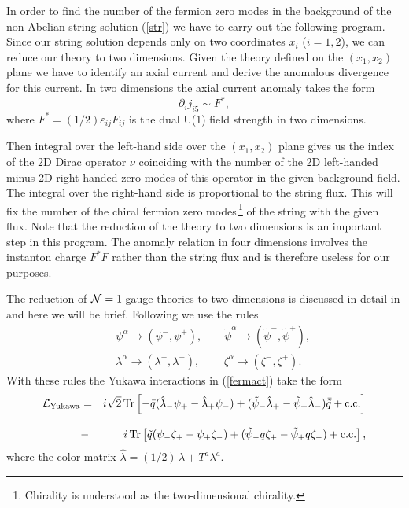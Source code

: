 \documentclass[epsfig,12pt]{article}
\def\beqn{\begin{eqnarray}}
\def\eeqn{\end{eqnarray}}
\def\beq{\begin{equation}}
\def\eeq{\end{equation}}
\newcommand{\none}{${\cal N}=1\;$}
\newcommand{\pt}{\partial}
\begin{document}
\mbox{}
\vspace{0.1mm}
\mbox{}

\noindent
In order to find the number of the fermion zero modes in the background
of the non-Abelian string solution (\ref{str}) we have to carry out the following
program. Since our string solution depends only on two  coordinates 
$x_i$ ($i=1,2$), we can reduce our theory to two dimensions. Given the theory
defined on the $(x_1,x_2)$ plane we have to identify an axial current and derive
the anomalous divergence for this current. In two dimensions the axial current anomaly takes the form
\beq
\pt_ij_{i5}\sim F^{*},
\label{appranom}
\eeq
where $F^{*}=(1/2)\varepsilon_{ij}F_{ij}$ is the dual U(1) field strength in 
two dimensions.

Then integral over the left-hand side over the $(x_1,x_2)$ plane gives us the index
of the 2D Dirac operator $\nu$ coinciding with the number of the 2D left-handed minus 2D right-handed zero modes of this
operator in the given background field. The integral over the right-hand side is proportional to the string flux. This will fix the number of the chiral fermion zero 
modes\,\footnote{Chirality is understood as the two-dimensional chirality.} of
the string with the  given flux. Note that the reduction of the theory to two dimensions
is an important step in this program. The anomaly relation in four dimensions
involves the instanton charge $F^{*}F$ rather than the string flux and is therefore 
useless for our purposes.

The reduction of \none gauge theories to two dimensions is discussed in 
detail in \cite{W93} and here we will be brief. Following \cite{W93} we
use the rules
\beqn
&& \psi^{\alpha}\to(\psi^{-},\psi^{+}), \qquad 
\tilde{\psi}^{\alpha}\to(\tilde{\psi}^{-},\tilde{\psi}^{+}), 
\nonumber\\[3mm]
&& \lambda^{\alpha}\to(\lambda^{-},\lambda^{+}),\,\qquad
\zeta^{\alpha}\to(\zeta^{-},\zeta^{+}).
\label{2dreduc}
\eeqn
With these rules the Yukawa interactions in (\ref{fermact}) take the form
\beqn
{\cal L}_{\rm Yukawa} &=&
i\sqrt{2}\,{\rm Tr}\left[ -\bar{q}(\hat{\lambda}_{-}\psi_{+}
-\hat{\lambda}_{+}\psi_{-})+
(\tilde{\psi}_{-}\hat{\lambda}_{+}
-\tilde{\psi}_{+}\hat{\lambda}_{-})\bar{\tilde{q}} 
+ {\rm c.c.}\right]
\nonumber\\[3mm]
&- &  i\,{\rm Tr}\left[ \tilde{q}(\psi_{-}\zeta_{+}-\psi_{+}\zeta_{-})+
(\tilde{\psi}_{-}q \zeta_{+}-
\tilde{\psi}_{+}q \zeta_{-})
+ {\rm c.c.}\right],
\label{yukawa}
\eeqn
where the color matrix $\hat{\lambda} = (1/2)\,\lambda +T^a\lambda^a$.
\end{document}
